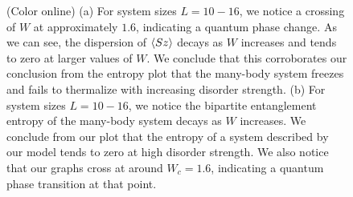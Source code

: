 \documentclass[prl,aps,epsf,showpacs,twocolumn]{revtex4}
\begin{document}
\begin{figure}
  \caption{(Color online) (a) For system sizes $L = 10-16$, we notice a crossing
    of $W$ at approximately $1.6$, indicating a quantum phase change. As we can
    see, the dispersion of $\braket{Sz}$ decays as $W$ increases and
    tends to zero at larger values of $W$. We conclude that this corroborates
    our conclusion from the entropy plot that the many-body system freezes and
    fails to thermalize with increasing disorder strength.  (b) For system sizes
    $L = 10-16$, we notice the bipartite entanglement entropy of the many-body
    system decays as $W$ increases. We conclude from our plot that the entropy
    of a system described by our model tends to zero at high disorder strength.
    We also notice that our graphs cross at around $W_c=1.6$, indicating a
    quantum phase transition at that point.
  }
\label{fig1}
\end{figure}
\end{document}
